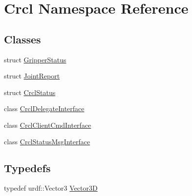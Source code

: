 \hypertarget{namespaceCrcl}{\section{Crcl Namespace Reference}
\label{namespaceCrcl}
}
\subsection*{Classes}
\begin{DoxyCompactItemize}
\item 
struct \hyperlink{structCrcl_1_1GripperStatus}{Gripper\-Status}
\item 
struct \hyperlink{structCrcl_1_1JointReport}{Joint\-Report}
\item 
struct \hyperlink{structCrcl_1_1CrclStatus}{Crcl\-Status}
\item 
class \hyperlink{classCrcl_1_1CrclDelegateInterface}{Crcl\-Delegate\-Interface}
\item 
class \hyperlink{classCrcl_1_1CrclClientCmdInterface}{Crcl\-Client\-Cmd\-Interface}
\item 
class \hyperlink{classCrcl_1_1CrclStatusMsgInterface}{Crcl\-Status\-Msg\-Interface}
\end{DoxyCompactItemize}
\subsection*{Typedefs}
\begin{DoxyCompactItemize}
\item 
typedef urdf\-::\-Vector3 \hyperlink{namespaceCrcl_a1b424aa4904c32a427cc66b566babf49}{Vector3\-D}
\end{DoxyCompactItemize}
